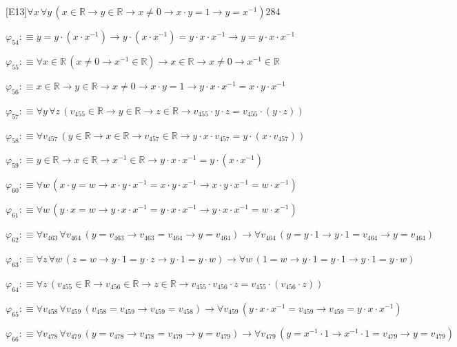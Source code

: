 \begin{fullproof}{[E13]}{$\forall x\,\forall y\,(x \in \mathbb{R} \to y \in \mathbb{R} \to x \neq 0 \to x \cdot y = 1 \to y = x^{-1})$}{284}
\begin{abbrevlist}
\item $\varphi_{54} :\equiv y = y \cdot (x \cdot x^{-1}) \to y \cdot (x \cdot x^{-1}) = y \cdot x \cdot x^{-1} \to y = y \cdot x \cdot x^{-1}$
\item $\varphi_{55} :\equiv \forall x \in \mathbb{R}\,(x \neq 0 \to x^{-1} \in \mathbb{R}) \to x \in \mathbb{R} \to x \neq 0 \to x^{-1} \in \mathbb{R}$
\item $\varphi_{56} :\equiv x \in \mathbb{R} \to y \in \mathbb{R} \to x \neq 0 \to x \cdot y = 1 \to y \cdot x \cdot x^{-1} = x \cdot y \cdot x^{-1}$
\item $\varphi_{57} :\equiv \forall y\,\forall z\,(v_{455} \in \mathbb{R} \to y \in \mathbb{R} \to z \in \mathbb{R} \to v_{455} \cdot y \cdot z = v_{455} \cdot (y \cdot z))$
\item $\varphi_{58} :\equiv \forall v_{457}\,(y \in \mathbb{R} \to x \in \mathbb{R} \to v_{457} \in \mathbb{R} \to y \cdot x \cdot v_{457} = y \cdot (x \cdot v_{457}))$
\item $\varphi_{59} :\equiv y \in \mathbb{R} \to x \in \mathbb{R} \to x^{-1} \in \mathbb{R} \to y \cdot x \cdot x^{-1} = y \cdot (x \cdot x^{-1})$
\item $\varphi_{60} :\equiv \forall w\,(x \cdot y = w \to x \cdot y \cdot x^{-1} = x \cdot y \cdot x^{-1} \to x \cdot y \cdot x^{-1} = w \cdot x^{-1})$
\item $\varphi_{61} :\equiv \forall w\,(y \cdot x = w \to y \cdot x \cdot x^{-1} = y \cdot x \cdot x^{-1} \to y \cdot x \cdot x^{-1} = w \cdot x^{-1})$
\item $\varphi_{62} :\equiv \forall v_{463}\,\forall v_{464}\,(y = v_{463} \to v_{463} = v_{464} \to y = v_{464}) \to \forall v_{464}\,(y = y \cdot 1 \to y \cdot 1 = v_{464} \to y = v_{464})$
\item $\varphi_{63} :\equiv \forall z\,\forall w\,(z = w \to y \cdot 1 = y \cdot z \to y \cdot 1 = y \cdot w) \to \forall w\,(1 = w \to y \cdot 1 = y \cdot 1 \to y \cdot 1 = y \cdot w)$
\item $\varphi_{64} :\equiv \forall z\,(v_{455} \in \mathbb{R} \to v_{456} \in \mathbb{R} \to z \in \mathbb{R} \to v_{455} \cdot v_{456} \cdot z = v_{455} \cdot (v_{456} \cdot z))$
\item $\varphi_{65} :\equiv \forall v_{458}\,\forall v_{459}\,(v_{458} = v_{459} \to v_{459} = v_{458}) \to \forall v_{459}\,(y \cdot x \cdot x^{-1} = v_{459} \to v_{459} = y \cdot x \cdot x^{-1})$
\item $\varphi_{66} :\equiv \forall v_{478}\,\forall v_{479}\,(y = v_{478} \to v_{478} = v_{479} \to y = v_{479}) \to \forall v_{479}\,(y = x^{-1} \cdot 1 \to x^{-1} \cdot 1 = v_{479} \to y = v_{479})$

\end{abbrevlist}
\end{fullproof}
